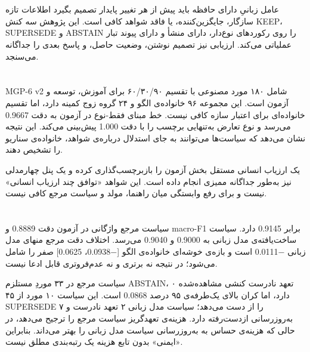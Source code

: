 \section{}\label{ux645ux633ux626ux644ux647}

عامل زبانیِ دارای حافظه باید پیش از هر تغییر پایدار تصمیم بگیرد اطلاعات
تازه سازگار، جایگزین‌کننده، یا فاقد شواهد کافی است. این پژوهش سه کنش
KEEP، SUPERSEDE و ABSTAIN را روی رکوردهای نوع‌دار، دارای منشأ و دارای
پیوند تبار عملیاتی می‌کند. ارزیابی نیز تصمیم نوشتن، وضعیت حاصل، و پاسخ
بعدی را جداگانه می‌سنجد.

\section{}\label{ux645ux645ux6ccux632ux6cc-ux67eux627ux6ccux644ux648ux62a-mgp-6-v2}

MGP-6 v2 شامل ۱۸۰ مورد مصنوعی با تقسیم ۶۰/۳۰/۹۰ برای آموزش، توسعه و
آزمون است. این مجموعه ۹۶ خانواده‌ی الگو و ۲۴ گروه زوج کمینه دارد، اما
تقسیم خانواده‌ای برای اعتبار سازه کافی نیست. خط مبنای فقط-نوع در آزمون به
دقت 0.9667 می‌رسد و نوع تعارض به‌تنهایی برچسب را با دقت 1.000 پیش‌بینی
می‌کند. این نتیجه نشان می‌دهد که سیاست‌ها می‌توانند به جای استدلال درباره‌ی
شواهد، خانواده‌ی سناریو را تشخیص دهند.

یک ارزیاب انسانی مستقل بخش آزمون را بازبرچسب‌گذاری کرده و یک پنل چهارمدلی
نیز به‌طور جداگانه ممیزی انجام داده است. این شواهد «توافق چند ارزیاب
انسانی» نیست و برای رفع وابستگی میان راهنما، مولد و سیاست مرجع کافی
نیست.

\section{}\label{ux646ux62aux627ux6ccux62c-ux62aux634ux62eux6ccux635ux6cc-ux633ux6ccux627ux633ux62aux647ux627}

سیاست مرجع واژگانی در آزمون دقت 0.8889 و macro-F1 برابر 0.9145 دارد.
سیاست ساخت‌یافته‌ی مدل زبانی به 0.9000 و 0.9040 می‌رسد. اختلاف دقت مرجع
منهای مدل زبانی −0.0111 است و بازه‌ی خوشه‌ای خانواده‌ی الگو {[}−0.0938،
0.0625{]} صفر را شامل می‌شود؛ در نتیجه نه برتری و نه عدم‌فروتری قابل ادعا
نیست.

سیاست مرجع در ۳۳ موردِ مستلزم ABSTAIN، ۰ تعهد نادرست کنشی مشاهده‌شده دارد،
اما کران بالای یک‌طرفه‌ی ۹۵ درصد 0.0868 است. این سیاست ۱۰ مورد از ۴۵
SUPERSEDE را از دست می‌دهد؛ سیاست مدل زبانی ۲ تعهد نادرست و ۷ به‌روزرسانی
ازدست‌رفته دارد. هزینه‌ی تعهد‌گریز سیاست مرجع را ترجیح می‌دهد، در حالی که
هزینه‌ی حساس به به‌روزرسانی سیاست مدل زبانی را بهتر می‌داند. بنابراین
«ایمنی» بدون تابع هزینه یک رتبه‌بندی مطلق نیست.

